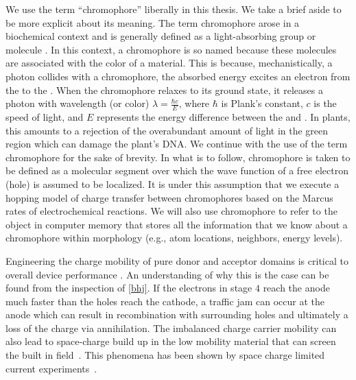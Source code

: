 We use the term ``chromophore'' liberally in this thesis. We take a brief aside to be more
explicit about its meaning.  
The term chromophore arose in a biochemical context and is generally defined
as a light-absorbing group or molecule \cite{biochemistry}.
In this context, a chromophore is so named because these molecules are associated with the color of a material.
This is because, mechanistically, a photon collides with a chromophore, the absorbed energy
excites an electron from the  to the
. When the chromophore relaxes to its
ground state, it releases a photon with wavelength (or color) $\lambda = \frac{\hbar c}{E}$,
where $\hbar$ is Plank's constant, $c$ is the speed of light, and $E$ represents the
energy difference between the  and . 
In plants, this amounts to a rejection of the overabundant amount of
light in the green region which can damage the plant's DNA. 
We continue with the use of the term chromophore
for the sake of brevity. In what is to follow, chromophore is taken to be defined as a molecular segment over which the 
wave function of a free electron (hole) is assumed to be localized.
It is under this assumption that we execute a hopping model of charge transfer between
chromophores based on the Marcus rates of electrochemical reactions. We will also use chromophore to refer to
the object in computer memory that stores all the information that we know about a chromophore within morphology
(e.g., atom locations, neighbors, energy levels).


Engineering the charge mobility of pure donor and acceptor domains is critical
to overall device performance \cite{Wang2019e}.
An understanding of why this is the case can be found from the inspection of \autoref{bhj}.
If the electrons in stage $4$ reach the anode much faster than the holes reach the cathode, a traffic jam can
occur at the anode which can result in recombination with surrounding holes and ultimately a loss of the
charge via annihilation. 
The imbalanced charge carrier mobility can also lead to space-charge build up in the 
low mobility material that can screen the built in field~\cite{Bartelt2015}.
This phenomena has been shown by space charge limited current experiments~\cite{Small2013}.

